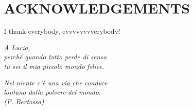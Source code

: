 \chapter*{ACKNOWLEDGEMENTS}
%
I thank everybody, evvvvvvvverybody!
%
\cleardoublepage
~

\begin{flushright}
  \emph{A Lucia, \\
  perch\'{e} quando tutto perde di senso \\
  tu sei il mio piccolo mondo felice.}
  
  \vspace{10cm}
  
   \emph{Nel niente c'\`{e} una via che conduce \\
   lontano dalla polvere del mondo.\\
   (F. Bertossa)
   } 
\end{flushright}

\cleardoublepage
